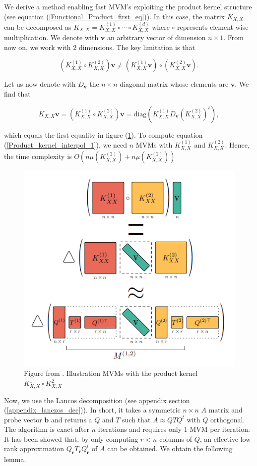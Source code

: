 \documentclass[12pt,a4paper,oneside]{book}
\begin{document}
We derive a method enabling fast MVM's exploiting the product kernel structure (see equation (\ref{Functional_Product_first_eq})). In this case, the matrix $K_{X,X}$ can be decomposed as $ K_{X,X} = K_{X,X}^{(1)} \circ \cdots \circ K_{X,X}^{(d)}$ where $\circ$ represents element-wise multiplication. We denote with $\bm{v}$ an arbitrary vector of dimension $n \times 1$.  From now on, we work with $2$ dimensions. The key limitation is that 

\begin{equation}
\left( K_{X,X}^{(1)} \circ K_{X,X}^{(2)} \right) \bm{v} \neq \left( K_{X,X}^{(1)} \bm{v} \right) \circ \left( K_{X,X}^{(2)} \bm{v} \right).
\end{equation}

Let us now denote with $D_{\bm{v}}$ the $n \times n$ diagonal matrix whose elements are $\bm{v}$. We find that 

\begin{equation}\label{Product_kernel_interpol_1}
K_{X,X} \bm{v} = \left( K_{X,X}^{(1)} \circ K_{X,X}^{(2)} \right) \bm{v} = \text{diag} \left( K_{X,X}^{(1)} D_{\bm{v}} (K_{X,X}^{(2)})^t \right),
\end{equation}

which equals the first equality in figure (\ref{fig:MVM}). To compute equation (\ref{Product_kernel_interpol_1}), we need $n$ MVMs with $K_{X,X}^{(1)}$ and $K_{X,X}^{(2)}$. Hence, the time complexity is $O(n \mu(K_{X,X}^{(2)}) +n \mu(K_{X,X}^{(2)}))$

\begin{figure}[!htb]
     \centering
     \includegraphics[width=0.4\linewidth]{matrix_vector_multiplication}
     \caption{Figure from \cite{gardner2018product}. Illustration MVMs with the product kernel $K_{X,X}^{1} \circ K_{X,X}^{2}$ }\label{fig:MVM}
\end{figure}

Now, we use the Lancos decomposition (see appendix section (\ref{appendix_lanczos_dec})). In short, it takes a symmetric $n \times n$ $A$ matrix and probe vector $\bm{b}$ and returns a $Q$ and $T$ such that $A \approx Q T Q^t$ with $Q$ orthogonal. The algorithm is exact after $n$ iterations and requires only $1$ MVM per iteration. It has been showed that, by only computing $r < n$ columns of $Q$, an effective low-rank approximation $Q_{\bm{r}} T_{\bm{r}} Q_{\bm{r}}^t$ of $A$ can be obtained. We obtain the following lemma. 
\end{document}

